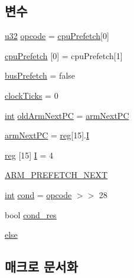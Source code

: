 \subsection*{변수}
\begin{DoxyCompactItemize}
\item 
\mbox{\hyperlink{_system_8h_a10e94b422ef0c20dcdec20d31a1f5049}{u32}} \mbox{\hyperlink{arm-new_8h_a4fc220098f4b9d0e039a28274d05c198}{opcode}} = \mbox{\hyperlink{thumb_8h_a697b194786a904a0e87abfe17000dd72}{cpu\+Prefetch}}\mbox{[}0\mbox{]}
\item 
\mbox{\hyperlink{arm-new_8h_a697b194786a904a0e87abfe17000dd72}{cpu\+Prefetch}} \mbox{[}0\mbox{]} = cpu\+Prefetch\mbox{[}1\mbox{]}
\item 
\mbox{\hyperlink{arm-new_8h_a134043aac3959cdf5fba654d934360cb}{bus\+Prefetch}} = false
\item 
\mbox{\hyperlink{arm-new_8h_a5810adc3187a4a31cbf4224c12414fb3}{clock\+Ticks}} = 0
\item 
\mbox{\hyperlink{_util_8cpp_a0ef32aa8672df19503a49fab2d0c8071}{int}} \mbox{\hyperlink{arm-new_8h_a50507170b2babce522bce8ba5d867fd8}{old\+Arm\+Next\+PC}} = \mbox{\hyperlink{thumb_8h_a7e8bf67a6667274a53fc092b97961ca4}{arm\+Next\+PC}}
\item 
\mbox{\hyperlink{arm-new_8h_a7e8bf67a6667274a53fc092b97961ca4}{arm\+Next\+PC}} = \mbox{\hyperlink{_globals_8h_ae29faba89509024ffd1a292badcedf2d}{reg}}\mbox{[}15\mbox{]}.\mbox{\hyperlink{thumb_8h_a782b7c7c9a56a2031f6270eac7f000d6}{I}}
\item 
\mbox{\hyperlink{_globals_8h_ae29faba89509024ffd1a292badcedf2d}{reg}} \mbox{[}15\mbox{]} \mbox{\hyperlink{arm-new_8h_a782b7c7c9a56a2031f6270eac7f000d6}{I}} = 4
\item 
\mbox{\hyperlink{arm-new_8h_a20dd0c8e065b8d3fe145119c5180f98a}{A\+R\+M\+\_\+\+P\+R\+E\+F\+E\+T\+C\+H\+\_\+\+N\+E\+XT}}
\item 
\mbox{\hyperlink{_util_8cpp_a0ef32aa8672df19503a49fab2d0c8071}{int}} \mbox{\hyperlink{arm-new_8h_a33a0b4d4eea3603435124a4255231922}{cond}} = \mbox{\hyperlink{thumb_8h_a4fc220098f4b9d0e039a28274d05c198}{opcode}} $>$$>$ 28
\item 
bool \mbox{\hyperlink{arm-new_8h_ae931ce7d834148867ceeb444446afb40}{cond\+\_\+res}}
\item 
\mbox{\hyperlink{arm-new_8h_a70950f1dde0051dab8b447bdd9bea999}{else}}
\end{DoxyCompactItemize}


\subsection{매크로 문서화}
\mbox{\label{arm-new_8h_ab5041382af3adc9d16fb9d1018dd7c85}} 
